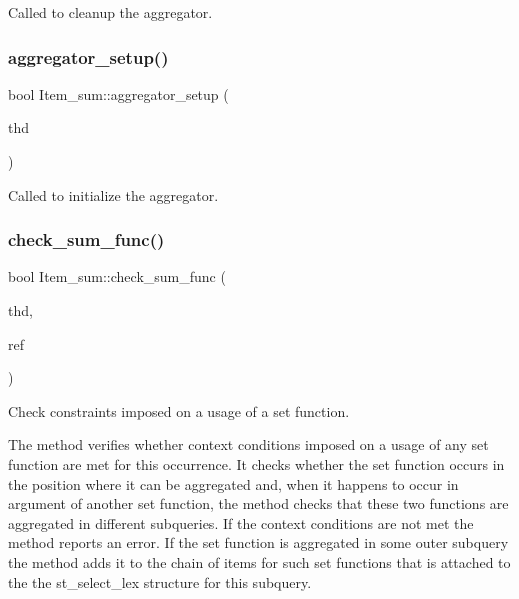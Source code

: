 Called to cleanup the aggregator. \mbox{\label{classItem__sum_ac84fa680a8b3690c6735474c9476f312}} 
\subsubsection{\texorpdfstring{aggregator\+\_\+setup()}{aggregator\_setup()}}
{\footnotesize\ttfamily bool Item\+\_\+sum\+::aggregator\+\_\+setup (\begin{DoxyParamCaption}\item[{T\+HD $\ast$}]{thd }\end{DoxyParamCaption})\hspace{0.3cm}{\ttfamily [inline]}}

Called to initialize the aggregator. \mbox{\label{classItem__sum_a6de4d25ee11eb43798effbd4968236bd}} 
\subsubsection{\texorpdfstring{check\+\_\+sum\+\_\+func()}{check\_sum\_func()}}
{\footnotesize\ttfamily bool Item\+\_\+sum\+::check\+\_\+sum\+\_\+func (\begin{DoxyParamCaption}\item[{T\+HD $\ast$}]{thd,  }\item[{\mbox{\hyperlink{classItem}{Item}} $\ast$$\ast$}]{ref }\end{DoxyParamCaption})}

Check constraints imposed on a usage of a set function.

The method verifies whether context conditions imposed on a usage of any set function are met for this occurrence. It checks whether the set function occurs in the position where it can be aggregated and, when it happens to occur in argument of another set function, the method checks that these two functions are aggregated in different subqueries. If the context conditions are not met the method reports an error. If the set function is aggregated in some outer subquery the method adds it to the chain of items for such set functions that is attached to the the st\+\_\+select\+\_\+lex structure for this subquery.

